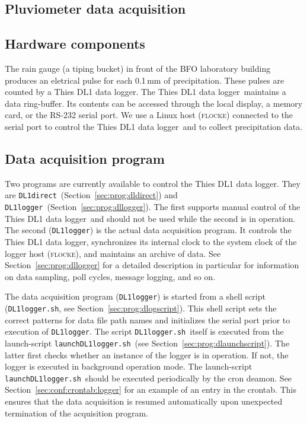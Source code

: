 \documentclass[twoside]{article}
\newcommand{\DTDL}{Thies DL1 data logger}
\newcommand{\Dlaunchscript}{\texttt{launchDL1logger.sh}}
\newcommand{\Dlogscript}{\texttt{DL1logger.sh}}
\newcommand{\DLdirect}{\texttt{DL1direct}}
\newcommand{\DLlogger}{\texttt{DL1logger}}
\newcommand{\Dloggerhost}{\textsc{flocke}}
\begin{document}
\begin{multicols}{2}
\parindent10pt
\parskip 0pt
\tableofcontents
\parindent0pt
\parskip 10pt
\section{Pluviometer data acquisition}
\subsection{Hardware components}
The rain gauge (a tiping bucket) in front of the BFO laboratory building
produces an eletrical pulse for each 0.1\,mm of precipitation.
These pulses are counted by a \DTDL.
The \DTDL\ maintains a data ring-buffer.
Its contents can be accessed through the local display, a memory card, or the
RS-232 serial port.
We use a Linux host (\Dloggerhost) connected to the serial port to control
the \DTDL\ and to collect precipitation data.

\subsection{Data acquisition program}
Two programs are currently available to control the \DTDL.
They are \DLdirect\ (Section~\ref{sec:prog:dldirect}) and \DLlogger\
(Section~\ref{sec:prog:dllogger}).
The first supports manual control of the \DTDL\ and should not be used while
the second is in operation.
The second (\DLlogger) is the actual data acquisition program.
It controls the \DTDL, synchronizes its internal clock to the system clock of
the logger host (\Dloggerhost), and maintains an archive of data.
See Section~\ref{sec:prog:dllogger} for a detailed description in particular
for information on data sampling, poll cycles, message logging, and so on.

The data acquisition program (\DLlogger) is started from a shell script
(\Dlogscript, see Section~\ref{sec:prog:dlogscript}).
This shell script sets the correct patterns for data file path names
and initializes the serial port prior to execution of \DLlogger.
The script \Dlogscript\ itself is executed from the launch-script
\Dlaunchscript\ (see Section~\ref{sec:prog:dlaunchscript}).
The latter first checks whether an instance of the logger is in operation. 
If not, the logger is executed in background operation mode.
The launch-script \Dlaunchscript\ should be executed periodically by the cron
deamon. 
See Section~\ref{sec:conf:crontab:logger} for an example of an entry in the
crontab.
This ensures that the data acquisition is resumed automatically upon
unexpected termination of the acquisition program.


\end{multicols}
\end{document}
